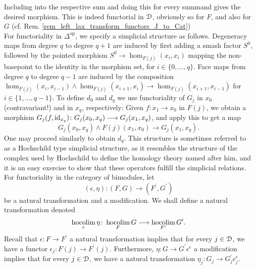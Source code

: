 \begin{defn}
      Including into the respective sum and doing this for every summand gives the desired morphism. This is indeed functorial in $\mathcal{D}$, obviously so for $F$, and also for $G$ (cf. Rem. \ref{rem_left_lax_transform_functors_J_to_Cat})\\
      For functoriality in $\Delta^{\mathrm{op}}$, we specify a simplicial structure as follows.
      Degeneracy maps from degree $q$ to degree $q+1$ are induced by first adding a smash factor $S^0$, followed by the pointed morphism $S^0 \to \hom_{F(j)}(x_i,x_i)$ mapping the non-basepoint to the identity in the morphism set, for $i \in \{ 0, \ldots, q \}$.
      Face maps from degree $q$ to degree $q-1$ are induced by the composition $\hom_{F(j)}(x_i,x_{i-1}) \wedge \hom_{F(j)}(x_{i+1},x_i) \to \hom_{F(j)}(x_{i+1},x_{i-1})$ for $i \in \{ 1, \ldots, q-1 \}$.
      To define $d_0$ and $d_q$ we use functoriality of $G_j$ in $x_0$ (contravariant!) and in $x_q$, respectively:
      Given $f: x_1 \to x_0$ in $F(j)$, we obtain a morphism $G_j(f,\operatorname{id}_{x_q}) \colon G_j(x_0,x_q) \longrightarrow G_j(x_1,x_q)$, and apply this to get a map
      \begin{displaymath}
        G_j(x_0,x_q) \wedge F(j)(x_1,x_0) \to G_j(x_1,x_q).
      \end{displaymath}
      One may proceed similarly to obtain $d_q$.
      This structure is sometimes referred to as a Hochschild type simplicial structure, as it resembles the structure of the complex used by Hochschild to define the homology theory named after him, and it is an easy exercise to show that these operators fulfill the simplicial relations.\\
      For functoriality in the category of bimodules, let
      \begin{displaymath}
        (\epsilon, \eta) \colon (F,G) \to (F^\prime, G^\prime)
      \end{displaymath}
      be a natural transformation and a modification.
      We shall define a natural transformation denoted
      \begin{displaymath}
        \operatorname*{hocolim}_\epsilon \eta \colon \operatorname*{hocolim}_F G \longrightarrow \operatorname*{hocolim}_{F^\prime} G^\prime.
      \end{displaymath}
      Recall that $\epsilon \colon F \to F^\prime$ a natural transformation implies that for every $j \in \mathcal{D}$, we have a functor $\epsilon_j \colon F(j) \to F^\prime(j)$.
      Furthermore, $\eta \colon G \to G^\prime \epsilon^e$ a modification implies that for every $j \in \mathcal{D}$, we have a natural transformation $\eta_j \colon G_j \to G^\prime_j\epsilon^e_j$.

\end{defn}
